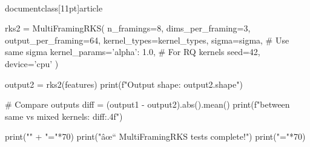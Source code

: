 \\documentclass[11pt]{article}
\begin{document}
\begin{CodeBlock}
    rks2 = MultiFramingRKS(
        n_framings=8,
        dims_per_framing=3,
        output_per_framing=64,
        kernel_types=kernel_types,
        sigma=sigma,  # Use same sigma
        kernel_params={'alpha': 1.0},  # For RQ kernels
        seed=42,
        device='cpu'
    )
    
    output2 = rks2(features)
    print(f"Output shape: {output2.shape}")
    
    # Compare outputs
    diff = (output1 - output2).abs().mean()
    print(f"\nDifference between same vs mixed kernels: {diff:.4f}")
    
    print("\n" + "="*70)
    print("âœ“ MultiFramingRKS tests complete!")
    print("="*70) 
\end{CodeBlock}
\end{document}
